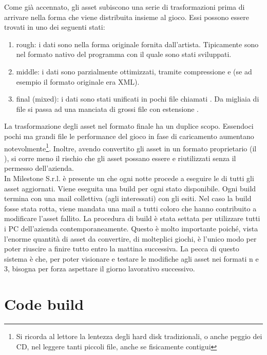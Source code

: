 Come già accennato, gli asset subiscono una serie di trasformazioni prima di arrivare nella forma che viene distribuita insieme al gioco. Essi possono essere trovati in uno dei seguenti stati:
\begin{enumerate}
	\item rough: i dati sono nella forma originale fornita dall'artista. Tipicamente sono nel formato nativo del programma con il quale sono stati sviluppati.
	\item middle: i dati sono parzialmente ottimizzati, tramite compressione e  (se ad esempio il formato originale era XML).
	\item final (mixed): i dati sono stati unificati in pochi file chiamati . Da migliaia di file si passa ad una manciata di grossi file con estensione .
\end{enumerate}

La trasformazione degli asset nel formato finale ha un duplice scopo. Essendoci pochi ma grandi file le performance del gioco in fase di caricamento aumentano notevolmente\footnote{Si ricorda al lettore la lentezza degli hard disk tradizionali, o anche peggio dei CD, nel leggere tanti piccoli file, anche se fisicamente contigui}. Inoltre, avendo convertito gli asset in un formato proprietario (il ), si corre meno il rischio che gli asset possano essere  e riutilizzati senza il permesso dell'azienda.\\

In Milestone S.r.l. è presente un  che ogni notte procede a eseguire le  di tutti gli asset aggiornati. Viene eseguita una build per ogni stato disponibile. Ogni build termina con una mail collettiva (agli interessati) con gli esiti. Nel caso la build fosse stata rotta, viene mandata una mail a tutti coloro che hanno contribuito a modificare l'asset fallito. La procedura di build è stata settata per utilizzare tutti i PC dell'azienda contemporaneamente. Questo è molto importante poiché, vista l'enorme quantità di asset da convertire, di molteplici giochi, è l'unico modo per poter riuscire a finire tutto entro la mattina successiva. La pecca di questo sistema è che, per poter visionare e testare le modifiche agli asset nei formati n e 3, bisogna per forza aspettare il giorno lavorativo successivo.

\section{Code build}

